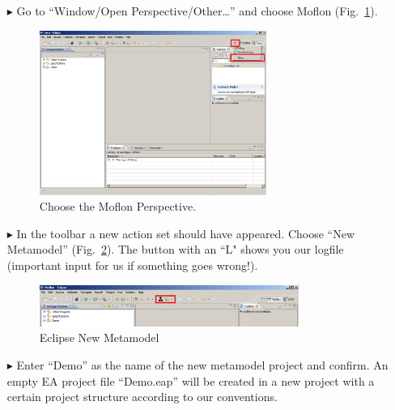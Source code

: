 \begin{enumerate}
\item[$\blacktriangleright$] Go to ``Window/Open Perspective/Other\ldots'' and
choose Moflon (Fig.~\ref{fig_eclipse}).
\begin{figure}[!h]
	\centering
  \includegraphics[width=0.7\textwidth]{pics/eclipse_firststart.png}
	\caption{Choose the Moflon Perspective.}
	\label{fig_eclipse}
\end{figure}

\item[$\blacktriangleright$] In the toolbar a new action set should have
appeared. Choose ``New Metamodel'' (Fig.~\ref{fig_eclipseNewMetamodel}).
The button with an ``L" shows you our logfile (important input for us if
something goes wrong!).
\begin{figure}[!h]
	\centering
  \includegraphics[width=0.8\textwidth]{pics/eclipse_metamodelButton.png}
	\caption{Eclipse New Metamodel}
	\label{fig_eclipseNewMetamodel}
\end{figure}

\item[$\blacktriangleright$] Enter ``Demo'' as the name of the new metamodel
project and confirm. 
An empty EA project file ``Demo.eap'' will be
created in a new project with a certain project structure
according to our conventions.

\newpage



\end{enumerate}
